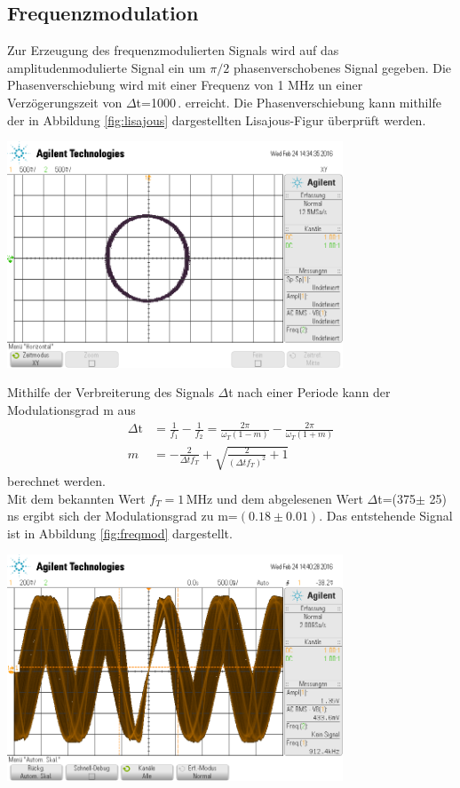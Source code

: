 \documentclass[]{scrartcl}
\begin{document}
\subsection{Frequenzmodulation}
Zur Erzeugung des frequenzmodulierten Signals wird auf das amplitudenmodulierte Signal ein um $\pi/2$ phasenverschobenes Signal gegeben. Die Phasenverschiebung wird mit einer Frequenz von 1 MHz un einer Verzögerungszeit von $\Delta$t=1000\,. erreicht. Die Phasenverschiebung kann mithilfe der in Abbildung \ref{fig:lisajous} dargestellten Lisajous-Figur überprüft werden. \\
\begin{center}
	\includegraphics[width=10cm]{images/lisajous.png}
	\label{fig:lisajous}
\end{center}
Mithilfe der Verbreiterung des Signals $\Delta$t nach einer Periode kann der Modulationsgrad m aus
\begin{align}
\Delta\text{t}&=\frac{1}{f_1}-\frac{1}{f_2}=\frac{2\pi}{\omega_T(1-m)}-\frac{2\pi}{\omega_T(1+m)} \\
m&=-\frac{2}{\Delta tf_T}+\sqrt{\frac{2}{(\Delta tf_T)^2}+1}
\end{align}
berechnet werden. \\
Mit dem bekannten Wert $f_T=1$\,MHz und dem abgelesenen Wert $\Delta$t=(375$\pm$ 25)\,ns ergibt sich der Modulationsgrad zu m=$(0.18\pm 0.01)$.
Das entstehende Signal ist in Abbildung \ref{fig:freqmod} dargestellt.
\begin{center}
	\includegraphics[width=10cm]{images/freqmod.png}
	\label{fig:freqmod}
\end{center}
\end{document}
